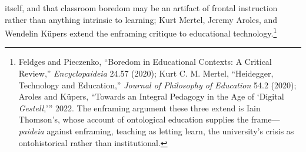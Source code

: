 itself, and that classroom boredom may be an artifact of frontal instruction rather than
anything intrinsic to learning; Kurt Mertel, Jeremy Aroles, and Wendelin Küpers extend the
enframing critique to educational technology.\footnote{Feldges and Pieczenko, ``Boredom in
Educational Contexts: A Critical Review,'' \textit{Encyclopaideia} 24.57 (2020); Kurt C. M. Mertel, ``Heidegger, Technology and Education,''
\textit{Journal of Philosophy of Education} 54.2 (2020); Aroles and K\"upers, ``Towards an Integral Pedagogy in the Age of `Digital
\textit{Gestell},''' 2022. The enframing argument these three extend is Iain Thomson's, whose
account of ontological education supplies the frame---\textit{paideia} against enframing,
teaching as letting learn, the university's crisis as ontohistorical rather than
institutional.}

